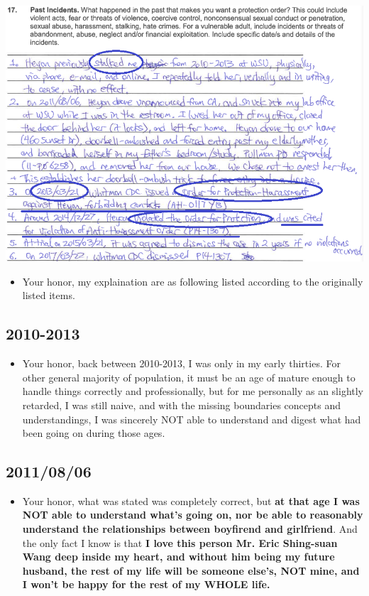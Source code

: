 \documentclass[9pt, b5paper]{article}
\begin{document}
\includegraphics[width=.9\linewidth]{./pic/dearCousin_20220919_183625.png}
\begin{itemize}
\item Your honor, my explaination are as following listed according to the originally listed items.
\end{itemize}
\subsection{2010-2013}
\label{sec-5-1}
\begin{itemize}
\item Your honor, back between 2010-2013, I was only in my early thirties. For other general majority of population, it must be an age of mature enough to handle things correctly and professionally, but for me personally as an slightly retarded, I was still naive, and with the missing boundaries concepts and understandings, I was sincerely NOT able to understand and digest what had been going on during those ages.
\end{itemize}
\subsection{2011/08/06}
\label{sec-5-2}
\begin{itemize}
\item Your honor, what was stated was completely correct, but \textbf{at that age I was NOT able to understand what's going on, nor be able to reasonably understand the relationships between boyfirend and girlfriend}. And the only fact I know is that \textbf{I love this person Mr. Eric Shing-suan Wang deep inside my heart, and without him being my future husband, the rest of my life will be someone else's, NOT mine, and I won't be happy for the rest of my WHOLE life.}
\end{itemize}
\end{document}
